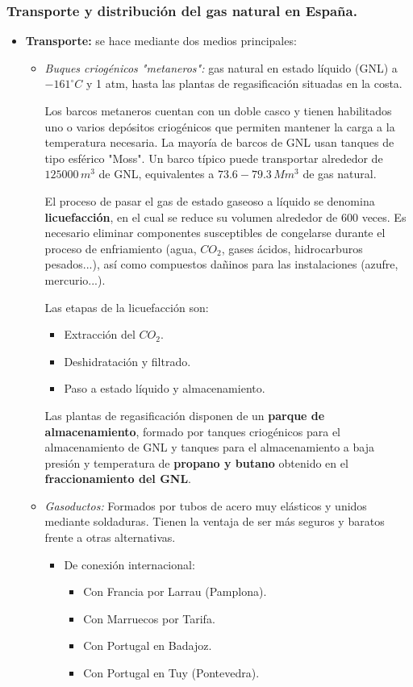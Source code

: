 		\subsubsection{Transporte y distribución del gas natural en España.}
		\begin{itemize}
			\item \textbf{Transporte:} se hace mediante dos medios principales:
				\begin{itemize}
					\item \textit{Buques criogénicos "metaneros":} gas natural en estado líquido (GNL) a $-161^\circ C$ y 1 atm, hasta las plantas de regasificación situadas en la costa.
					
					
					Los barcos metaneros cuentan con un doble casco y tienen habilitados uno o varios depósitos criogénicos que permiten mantener la carga a la temperatura necesaria. La mayoría de barcos de GNL usan tanques de tipo esférico "Moss". Un barco típico puede transportar alrededor de $125000\,m^3$ de GNL, equivalentes a $73.6-79.3\,Mm^3$ de gas natural.
					
					
					El proceso de pasar el gas de estado gaseoso a líquido se denomina \textbf{licuefacción}, en el cual se reduce su volumen alrededor de 600 veces. Es necesario eliminar componentes susceptibles de congelarse durante el proceso de enfriamiento (agua, $\textit{CO}_2$, gases ácidos, hidrocarburos pesados...), así como compuestos dañinos para las instalaciones (azufre, mercurio...).
					
					
					Las etapas de la licuefacción son:
					\begin{itemize}
						\item Extracción del $\textit{CO}_2$.
						\item Deshidratación y filtrado.
						\item Paso a estado líquido y almacenamiento.
					\end{itemize}
					
					
					Las plantas de regasificación disponen de un \textbf{parque de almacenamiento}, formado por tanques criogénicos para el almacenamiento de GNL y tanques para el almacenamiento a baja presión y temperatura de \textbf{propano y butano} obtenido en el \textbf{fraccionamiento del GNL}.
					
					\item \textit{Gasoductos:} 
						Formados por tubos de acero muy elásticos y unidos mediante soldaduras. Tienen la ventaja de ser más seguros y baratos frente a otras alternativas.
					\begin{itemize}
						\item De conexión internacional:
							\begin{itemize}
								\item Con Francia por Larrau (Pamplona).
								\item Con Marruecos por Tarifa.
								\item Con Portugal en Badajoz.
								\item Con Portugal en Tuy (Pontevedra).
							\end{itemize}
							

\end{itemize}
\end{itemize}
\end{itemize}
